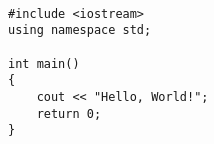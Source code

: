 ﻿\lstset{ 
	extendedchars=true,              %
	keepspaces=true,                 %
	language=[11]C++,                 %
	showstringspaces=false
}

\begin{lstlisting}[frame=single, caption={Hello World!}]  % Start your code-block

#include <iostream>
using namespace std;

int main() 
{
    cout << "Hello, World!";
    return 0;
}

\end{lstlisting}
